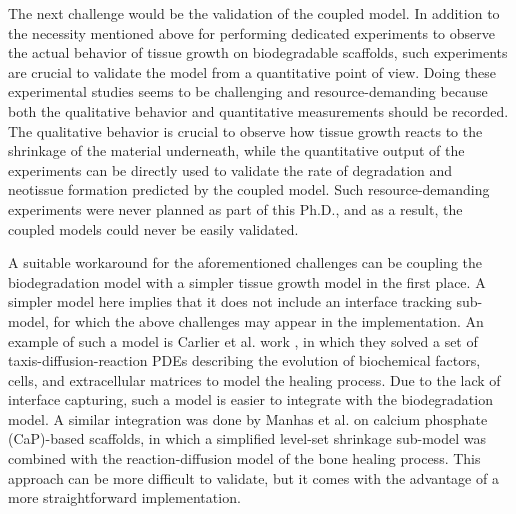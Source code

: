 The next challenge would be the validation of the coupled model. In addition to the necessity mentioned above for performing dedicated experiments to observe the actual behavior of tissue growth on biodegradable scaffolds, such experiments are crucial to validate the model from a quantitative point of view. Doing these experimental studies seems to be challenging and resource-demanding because both the qualitative behavior and quantitative measurements should be recorded. The qualitative behavior is crucial to observe how tissue growth reacts to the shrinkage of the material underneath, while the quantitative output of the experiments can be directly used to validate the rate of degradation and neotissue formation predicted by the coupled model. Such resource-demanding experiments were never planned as part of this Ph.D., and as a result, the coupled models could never be easily validated.


A suitable workaround for the aforementioned challenges can be coupling the biodegradation model with a simpler tissue growth model in the first place. A simpler model here implies that it does not include an interface tracking sub-model, for which the above challenges may appear in the implementation. An example of such a model is Carlier et al. work \cite{Carlier2012,Carlier2016}, in which they solved a set of taxis-diffusion-reaction PDEs describing the evolution of biochemical factors, cells, and extracellular matrices to model the healing process. Due to the lack of interface capturing, such a model is easier to integrate with the biodegradation model. A similar integration was done by Manhas et al. \cite{Manhas2016} on calcium phosphate (CaP)-based scaffolds, in which a simplified level-set shrinkage sub-model was combined with the reaction-diffusion model of the bone healing process. This approach can be more difficult to validate, but it comes with the advantage of a more straightforward implementation.


%
%
%
%
%
%
%

\cleardoublepage



